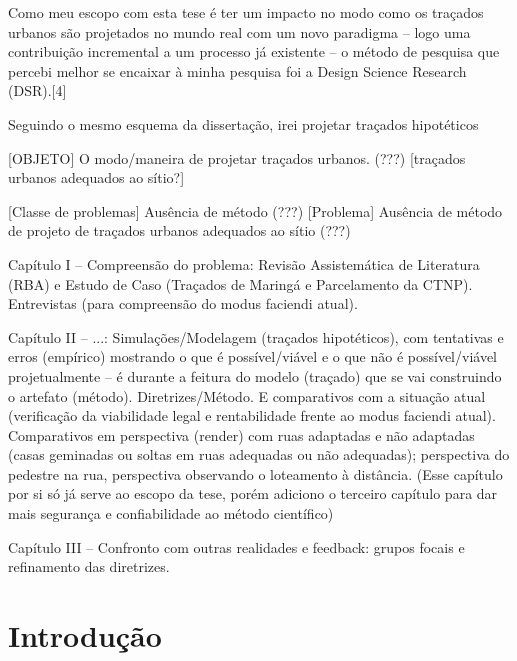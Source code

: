 \documentclass[]{report}
\begin{document}
	Como meu escopo com esta tese é ter um impacto no modo como os traçados urbanos são projetados no mundo real com um novo paradigma – logo uma contribuição incremental a um processo já existente – o método de pesquisa que percebi melhor se encaixar à minha pesquisa foi a Design Science Research (DSR).[4]

	Seguindo o mesmo esquema da dissertação, irei projetar traçados hipotéticos

	[OBJETO] O modo/maneira de projetar traçados urbanos. (???) [traçados urbanos adequados ao sítio?]

	[Classe de problemas] Ausência de método (???) [Problema] Ausência de método de projeto de traçados urbanos adequados ao sítio (???)

	Capítulo I – Compreensão do problema: Revisão Assistemática de Literatura (RBA) e Estudo de Caso (Traçados de Maringá e Parcelamento da CTNP). Entrevistas (para compreensão do modus faciendi atual).

	Capítulo II – ...: Simulações/Modelagem (traçados hipotéticos), com tentativas e erros (empírico) mostrando o que é possível/viável e o que não é possível/viável projetualmente – é durante a feitura do modelo (traçado) que se vai construindo o artefato (método). Diretrizes/Método. E comparativos com a situação atual (verificação da viabilidade legal e rentabilidade frente ao modus faciendi atual). Comparativos em perspectiva (render) com ruas adaptadas e não adaptadas (casas geminadas ou soltas em ruas adequadas ou não adequadas); perspectiva do pedestre na rua, perspectiva observando o loteamento à distância. (Esse capítulo por si só já serve ao escopo da tese, porém adiciono o terceiro capítulo para dar mais segurança e confiabilidade ao método científico)

	Capítulo III – Confronto com outras realidades e feedback: grupos focais e refinamento das diretrizes.

\chapter*{Introdução}
\end{document}
